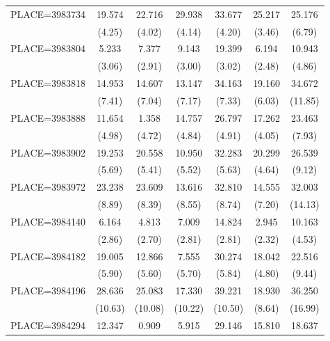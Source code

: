 {\begin{tabular}{l*{6}{c}}
PLACE=3983734       &      19.574&      22.716&      29.938&      33.677&      25.217&      25.176\\
                    &      (4.25)&      (4.02)&      (4.14)&      (4.20)&      (3.46)&      (6.79)\\
PLACE=3983804       &       5.233&       7.377&       9.143&      19.399&       6.194&      10.943\\
                    &      (3.06)&      (2.91)&      (3.00)&      (3.02)&      (2.48)&      (4.86)\\
PLACE=3983818       &      14.953&      14.607&      13.147&      34.163&      19.160&      34.672\\
                    &      (7.41)&      (7.04)&      (7.17)&      (7.33)&      (6.03)&     (11.85)\\
PLACE=3983888       &      11.654&       1.358&      14.757&      26.797&      17.262&      23.463\\
                    &      (4.98)&      (4.72)&      (4.84)&      (4.91)&      (4.05)&      (7.93)\\
PLACE=3983902       &      19.253&      20.558&      10.950&      32.283&      20.299&      26.539\\
                    &      (5.69)&      (5.41)&      (5.52)&      (5.63)&      (4.64)&      (9.12)\\
PLACE=3983972       &      23.238&      23.609&      13.616&      32.810&      14.555&      32.003\\
                    &      (8.89)&      (8.39)&      (8.55)&      (8.74)&      (7.20)&     (14.13)\\
PLACE=3984140       &       6.164&       4.813&       7.009&      14.824&       2.945&      10.163\\
                    &      (2.86)&      (2.70)&      (2.81)&      (2.81)&      (2.32)&      (4.53)\\
PLACE=3984182       &      19.005&      12.866&       7.555&      30.274&      18.042&      22.516\\
                    &      (5.90)&      (5.60)&      (5.70)&      (5.84)&      (4.80)&      (9.44)\\
PLACE=3984196       &      28.636&      25.083&      17.330&      39.221&      18.930&      36.250\\
                    &     (10.63)&     (10.08)&     (10.22)&     (10.50)&      (8.64)&     (16.99)\\
PLACE=3984294       &      12.347&       0.909&       5.915&      29.146&      15.810&      18.637\\

\end{tabular}}
